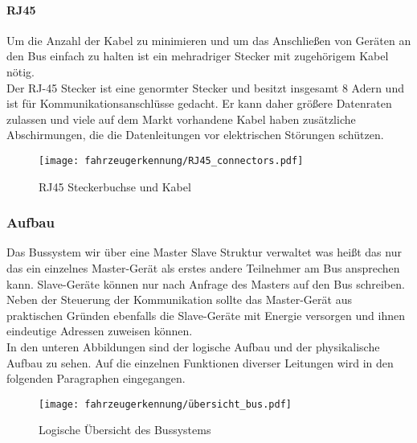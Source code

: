\paragraph{RJ45}\mbox{}
Um die Anzahl der Kabel zu minimieren und um das Anschließen von Geräten an den Bus einfach zu halten ist ein
mehradriger Stecker mit zugehörigem Kabel nötig.\\
Der RJ-45 Stecker ist eine genormter Stecker und besitzt insgesamt 8 Adern und ist für Kommunikationsanschlüsse gedacht. Er kann daher größere Datenraten zulassen und viele auf dem
Markt vorhandene Kabel haben zusätzliche Abschirmungen, die die Datenleitungen vor elektrischen Störungen schützen. 

\begin{figure}[H]
    \centering
    \texttt{[image: fahrzeugerkennung/RJ45\_connectors.pdf]}
    \caption{RJ45 Steckerbuchse und Kabel}
\end{figure}



\subsubsection{Aufbau}

Das Bussystem wir über eine Master Slave Struktur verwaltet was heißt das nur das ein einzelnes Master-Gerät als erstes andere Teilnehmer am Bus ansprechen kann.
Slave-Geräte können nur nach Anfrage des Masters auf den Bus schreiben. Neben der Steuerung der Kommunikation sollte das Master-Gerät aus praktischen Gründen ebenfalls die Slave-Geräte
mit Energie versorgen und ihnen eindeutige Adressen zuweisen können. \\

In den unteren Abbildungen sind der logische Aufbau und der physikalische Aufbau zu sehen.
Auf die einzelnen Funktionen diverser Leitungen wird in den folgenden Paragraphen eingegangen.

\begin{figure}[H]
    \centering
    \texttt{[image: fahrzeugerkennung/übersicht\_bus.pdf]}
    \caption{Logische Übersicht des Bussystems}
\end{figure}

